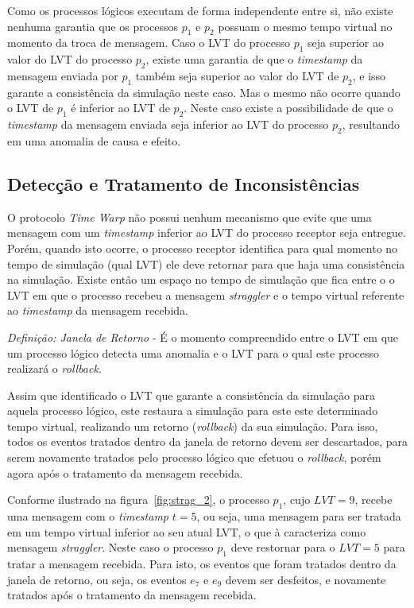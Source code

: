Como os processos lógicos executam de forma independente entre si, não existe nenhuma garantia que os processos $p_{1}$ e $p_{2}$ possuam o mesmo tempo virtual no momento da troca de mensagem. Caso o LVT do processo $p_{1}$ seja superior ao valor do LVT do processo $p_{2}$, existe uma garantia de que o \textit{timestamp} da mensagem enviada por $p_{1}$ também seja superior ao valor do LVT de $p_{2}$, e isso garante a consistência da simulação neste caso. Mas o mesmo não ocorre quando o LVT de $p_{1}$ é inferior ao LVT de $p_{2}$. Neste caso existe a possibilidade de que o \textit{timestamp} da mensagem enviada seja inferior ao LVT do processo $p_{2}$, resultando em uma anomalia de causa e efeito.

\subsection{Detecção e Tratamento de Inconsistências}

O protocolo \textit{Time Warp} não possui nenhum mecanismo que evite que uma mensagem com um \textit{timestamp} inferior ao LVT do processo receptor seja entregue. Porém, quando isto ocorre, o processo receptor identifica para qual momento no tempo de simulação (qual LVT) ele deve retornar para que haja uma consistência na simulação. Existe então um espaço no tempo de simulação que fica entre o o LVT em que o processo recebeu a mensagem \textit{straggler} e o tempo virtual referente ao \textit{timestamp} da mensagem recebida.

\emph{Definição: Janela de Retorno} - É o momento compreendido entre o LVT em que um processo lógico detecta uma anomalia e o LVT para o qual este processo realizará o \textit{rollback}.

Assim que identificado o LVT que garante a consistência da simulação para aquela processo lógico, este restaura a simulação para este este determinado tempo virtual, realizando um retorno (\textit{rollback}) da sua simulação. Para isso, todos os eventos tratados dentro da janela de retorno devem ser descartados, para serem novamente tratados pelo processo lógico que efetuou o \textit{rollback}, porém agora após o tratamento da mensagem recebida.

Conforme ilustrado na figura~\ref{fig:strag_2}, o processo $p_{1}$, cujo $LVT=9$, recebe uma mensagem com o \textit{timestamp} $t=5$, ou seja, uma mensagem para ser tratada em um tempo virtual inferior ao seu atual LVT, o que à caracteriza como mensagem \textit{straggler}. Neste caso o processo $p_{1}$ deve restornar para o $LVT=5$ para tratar a mensagem recebida. Para isto, os eventos que foram tratados dentro da janela de retorno, ou seja, os eventos $e_{7}$ e $e_{9}$ devem ser desfeitos, e novamente tratados após o tratamento da mensagem recebida.

